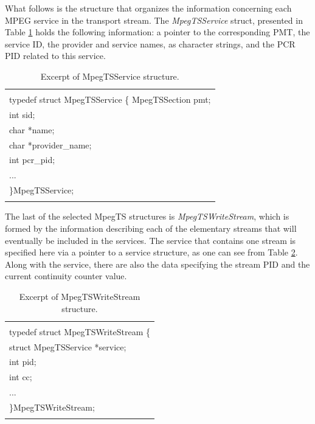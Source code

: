 \documentclass[
	12pt,				%
	openright,			%
	twoside,			%
	a4paper,			%
	brazil,
	french,				%
	english
	]{abntex2}
\begin{document}
What follows is the structure that organizes the information concerning each MPEG service in the transport stream. The \textit{MpegTSService} struct, presented in Table \ref{tab_MpegTSService} holds the following information: a pointer to the corresponding PMT, the service ID, the provider and service names, as character strings, and the PCR PID related to this service.

\begin{table}[!htpd]
\label{tab_MpegTSService}
\caption{ Excerpt of MpegTSService structure.}
\begin{center}
\begin{tabular}{|l|}
\hline
\\
typedef struct MpegTSService \{
MpegTSSection pmt; \\
int sid; \\
char *name;\\
char *provider\_name;\\
int pcr\_pid;\\
...\\
\}MpegTSService;\\
 \\
\hline
\end{tabular}
\end{center}
\end{table}

The last of the selected MpegTS structures is \textit{MpegTSWriteStream}, which is formed by the information describing each of the elementary streams that will eventually be included in the services. The service that contains one stream is specified here via a pointer to a service structure, as one can see from Table \ref{tab_MpegTSWriteStream}. Along with the service, there are also the data specifying the stream PID and the current continuity counter value.

\begin{table}[!htpd]
\label{tab_MpegTSWriteStream}
\caption{ Excerpt of MpegTSWriteStream structure.}
\begin{center}
\begin{tabular}{|l|}
\hline
\\
typedef struct MpegTSWriteStream \{\\
struct MpegTSService *service;\\
int pid;\\
int cc;\\
...\\
\}MpegTSWriteStream;\\
 \\
\hline
\end{tabular}
\end{center}
\end{table}
\end{document}
